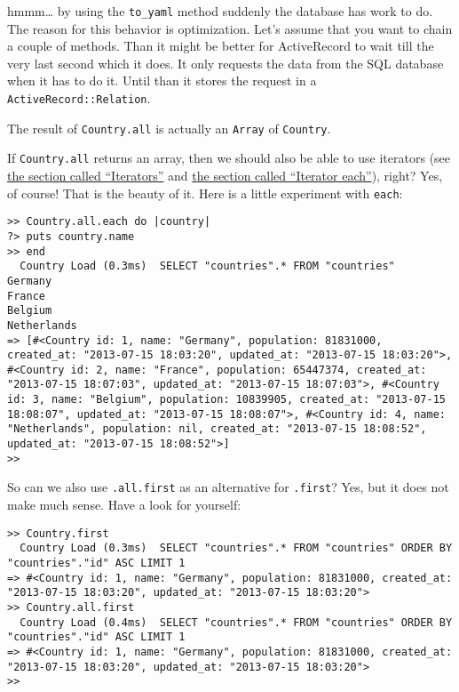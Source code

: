 \documentclass[a4paper]{book}
\newcounter{tab}[chapter]
\begin{document}
hmmm\ldots{} by using the \texttt{to\_yaml} method suddenly the database has work to do. The reason for this behavior is optimization. Let's assume that you want to chain a couple of methods. Than it might be better for ActiveRecord to wait till the very last second which it does. It only requests the data from the SQL database when it has to do it. Until than it stores the request in a \texttt{ActiveRecord::Relation}.

The result of \texttt{Country.all} is actually an \texttt{Array} of \texttt{Country}.

If \texttt{Country.all} returns an array, then we should also be able to use iterators (see \hyperref[iterator]{the section called “Iterators”} and \hyperref[arrayux5fiterator]{the section called “Iterator each”}), right? Yes, of course! That is the beauty of it. Here is a little experiment with \texttt{each}:

\begin{shaded}\begin{verbatim}
>> Country.all.each do |country|
?> puts country.name
>> end
  Country Load (0.3ms)  SELECT "countries".* FROM "countries"
Germany
France
Belgium
Netherlands
=> [#<Country id: 1, name: "Germany", population: 81831000, created_at: "2013-07-15 18:03:20", updated_at: "2013-07-15 18:03:20">, #<Country id: 2, name: "France", population: 65447374, created_at: "2013-07-15 18:07:03", updated_at: "2013-07-15 18:07:03">, #<Country id: 3, name: "Belgium", population: 10839905, created_at: "2013-07-15 18:08:07", updated_at: "2013-07-15 18:08:07">, #<Country id: 4, name: "Netherlands", population: nil, created_at: "2013-07-15 18:08:52", updated_at: "2013-07-15 18:08:52">]
>>
\end{verbatim}\end{shaded}

So can we also use \texttt{.all.first} as an alternative for \texttt{.first}? Yes, but it does not make much sense. Have a look for yourself:

\begin{shaded}\begin{verbatim}
>> Country.first
  Country Load (0.3ms)  SELECT "countries".* FROM "countries" ORDER BY "countries"."id" ASC LIMIT 1
=> #<Country id: 1, name: "Germany", population: 81831000, created_at: "2013-07-15 18:03:20", updated_at: "2013-07-15 18:03:20">
>> Country.all.first
  Country Load (0.4ms)  SELECT "countries".* FROM "countries" ORDER BY "countries"."id" ASC LIMIT 1
=> #<Country id: 1, name: "Germany", population: 81831000, created_at: "2013-07-15 18:03:20", updated_at: "2013-07-15 18:03:20">
>>
\end{verbatim}\end{shaded}
\end{document}

